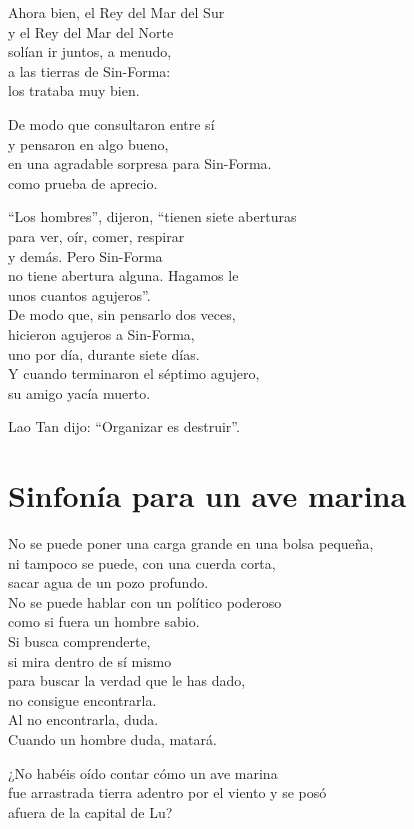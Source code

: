 \documentclass[hidelinks]{memoir}
\begin{document}
	Ahora bien, el Rey del Mar del Sur\\
	y el Rey del Mar del Norte\\
	solían ir juntos, a menudo,\\
	a las tierras de Sin-Forma:\\
	los trataba muy bien.
	
	De modo que consultaron entre sí\\
	y pensaron en algo bueno,\\
	en una agradable sorpresa para Sin-Forma.\\
	como prueba de aprecio.
	
	``Los hombres'', dijeron, ``tienen siete aberturas\\
	para ver, oír, comer, respirar\\
	y demás. Pero Sin-Forma\\
	no tiene abertura alguna. Hagamos le\\
	unos cuantos agujeros''.\\
	De modo que, sin pensarlo dos veces,\\
	hicieron agujeros a Sin-Forma,\\
	uno por día, durante siete días.\\
	Y cuando terminaron el séptimo agujero,\\
	su amigo yacía muerto.
	
	Lao Tan dijo: ``Organizar es destruir''.
	
	\chapter*{Sinfonía para un ave marina}
	
	No se puede poner una carga grande en una bolsa pequeña,\\
	ni tampoco se puede, con una cuerda corta,\\
	sacar agua de un pozo profundo.\\
	No se puede hablar con un político poderoso\\
	como si fuera un hombre sabio.\\
	Si busca comprenderte,\\
	si mira dentro de sí mismo\\
	para buscar la verdad que le has dado,\\
	no consigue encontrarla.\\
	Al no encontrarla, duda.\\
	Cuando un hombre duda, matará.
	
	¿No habéis oído contar cómo un ave marina\\
	fue arrastrada tierra adentro por el viento y se posó\\
	afuera de la capital de Lu?
	
\end{document}
